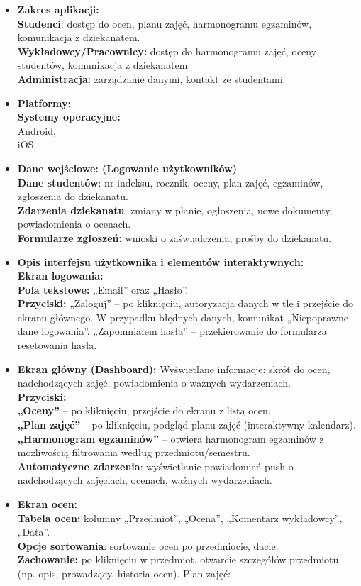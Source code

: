 \begin{itemize}
\item \textbf{Zakres aplikacji:}
\\\textbf{Studenci}: dostęp do ocen, planu zajęć, harmonogramu egzaminów, komunikacja z dziekanatem.
\\\textbf{Wykładowcy/Pracownicy:} dostęp do harmonogramu zajęć, oceny studentów, komunikacja z dziekanatem.
\\\textbf{Administracja: }zarządzanie danymi, kontakt ze studentami.
\item \textbf{Platformy:}
\\\textbf{Systemy operacyjne:} \\Android, \\iOS. 
\newpage
\item \textbf{Dane wejściowe: (Logowanie użytkowników)}
\\\textbf{Dane studentów}: nr indeksu, rocznik, oceny, plan zajęć, egzaminów, zgłoszenia do dziekanatu.
\\\textbf{Zdarzenia dziekanatu}: zmiany w planie, ogłoszenia, nowe dokumenty, powiadomienia o ocenach.
\\\textbf{Formularze zgłoszeń:} wnioski o zaświadczenia, prośby do dziekanatu.
\item \textbf{Opis interfejsu użytkownika i elementów interaktywnych:}
\\\textbf{Ekran logowania:}
\\\textbf{Pola tekstowe:} „Email” oraz „Hasło”.
\\\textbf{Przyciski:} „Zaloguj” – po kliknięciu, autoryzacja danych w tle i przejście do ekranu głównego. W przypadku błędnych danych, komunikat „Niepoprawne dane logowania”. „Zapomniałem hasła” – przekierowanie do formularza resetowania hasła.
\item  \textbf{Ekran główny (Dashboard):}
Wyświetlane informacje: skrót do ocen, nadchodzących zajęć, powiadomienia o ważnych wydarzeniach.
\\\textbf{Przyciski:}
\\\textbf{„Oceny”} – po kliknięciu, przejście do ekranu z listą ocen.
\\\textbf{„Plan zajęć”} – po kliknięciu, podgląd planu zajęć (interaktywny kalendarz).
\\\textbf{„Harmonogram egzaminów”} – otwiera harmonogram egzaminów z możliwością filtrowania według przedmiotu/semestru.
\\\textbf{Automatyczne zdarzenia}: wyświetlanie powiadomień push o nadchodzących zajęciach, ocenach, ważnych wydarzeniach.
\item \textbf{Ekran ocen:}
\\\textbf{Tabela ocen:} kolumny „Przedmiot”, „Ocena”, „Komentarz wykładowcy”, „Data”.
\\\textbf{Opcje sortowania}: sortowanie ocen po przedmiocie, dacie.
\\\textbf{Zachowanie:} po kliknięciu w przedmiot, otwarcie szczegółów przedmiotu (np. opis, prowadzący, historia ocen).
Plan zajęć:


\end{itemize}
